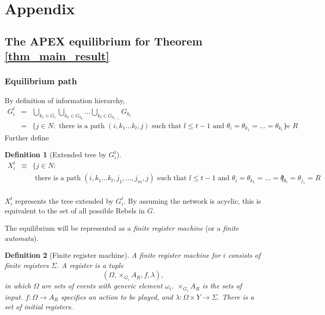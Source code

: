 \documentclass[12pt,letter]{article}
\newtheorem{definition}{Definition}[section]
\theoremstyle{definition}
\theoremstyle{remark}
\theoremstyle{claim}
\begin{document}


\appendix
\section{Appendix}
\subsection{The APEX equilibrium for Theorem \ref{thm_main_result}}
\subsubsection{Equilibrium path}
By definition of information hierarchy, 
\begin{eqnarray*}
G^t_i & = & \bigcup_{k_1\in G_i}\bigcup_{k_2\in G_{k_0}}...\bigcup_{k_{t}\in G_{k_{t-1}}}G_{k_{t}}\\
&= & \{j\in N: \text{ there is a path $(i,k_1...k_{l},j)$ such that $l\leq t-1$ and $\theta_i=\theta_{k_1}=...=\theta_{k_l}=R$}\}.
\end{eqnarray*}
Further define
\begin{definition}[Extended tree by $G^t_i$]
\label{def:ext_tree}
\begin{eqnarray*}
X^t_i & \equiv &  \{j\in N: \\
	& & \text{ there is a path $(i,k_1...k_{l},j_1,...,j_m,j)$ such that $l\leq t-1$ and $\theta_i=\theta_{k_1}=...=\theta_{k_l}=\theta_{j_1}=R$}\}.\\
\end{eqnarray*}
\end{definition}
$X^t_i $ represents the tree extended by $G^t_i$. By assuming the network is acyclic, this is equivalent to the set of all possible Rebels in $G$. 

The equilibrium will be represented as a \textit{finite register machine} (or a \textit{finite automata}). 
\begin{definition}[Finite register machine]
A finite register machine for $i$ consists of finite registers $\Sigma$. A register is a tuple \[(\Omega, \times_{G_i}A_R,f,\lambda),\] in which $\Omega$ are sets of events with generic element $\omega_i$. $\times_{G_i}A_R$ is the sets of input. $f:\Omega\rightarrow A_{R}$ specifies an action to be played, and $\lambda: \Omega\times Y \rightarrow \Sigma$. There is a set of initial registers.
\end{definition}
\end{document}
